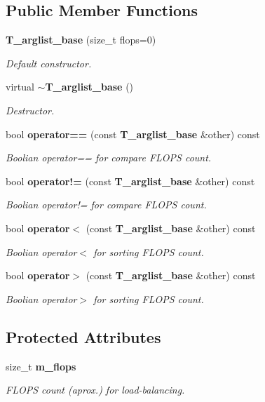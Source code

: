 \subsection*{Public Member Functions}
\begin{DoxyCompactItemize}
\item 
{\bf T\-\_\-arglist\-\_\-base} (size\-\_\-t flops=0)
\begin{DoxyCompactList}\small\item\em Default constructor. \end{DoxyCompactList}\item 
virtual {\bf $\sim$\-T\-\_\-arglist\-\_\-base} ()
\begin{DoxyCompactList}\small\item\em Destructor. \end{DoxyCompactList}\item 
bool {\bf operator==} (const {\bf T\-\_\-arglist\-\_\-base} \&other) const 
\begin{DoxyCompactList}\small\item\em Boolian operator== for compare F\-L\-O\-P\-S count. \end{DoxyCompactList}\item 
bool {\bf operator!=} (const {\bf T\-\_\-arglist\-\_\-base} \&other) const 
\begin{DoxyCompactList}\small\item\em Boolian operator!= for compare F\-L\-O\-P\-S count. \end{DoxyCompactList}\item 
bool {\bf operator$<$} (const {\bf T\-\_\-arglist\-\_\-base} \&other) const 
\begin{DoxyCompactList}\small\item\em Boolian operator$<$ for sorting F\-L\-O\-P\-S count. \end{DoxyCompactList}\item 
bool {\bf operator$>$} (const {\bf T\-\_\-arglist\-\_\-base} \&other) const 
\begin{DoxyCompactList}\small\item\em Boolian operator$>$ for sorting F\-L\-O\-P\-S count. \end{DoxyCompactList}\end{DoxyCompactItemize}
\subsection*{Protected Attributes}
\begin{DoxyCompactItemize}
\item 
size\-\_\-t {\bf m\-\_\-flops}
\begin{DoxyCompactList}\small\item\em F\-L\-O\-P\-S count (aprox.) for load-\/balancing. \end{DoxyCompactList}\end{DoxyCompactItemize}


